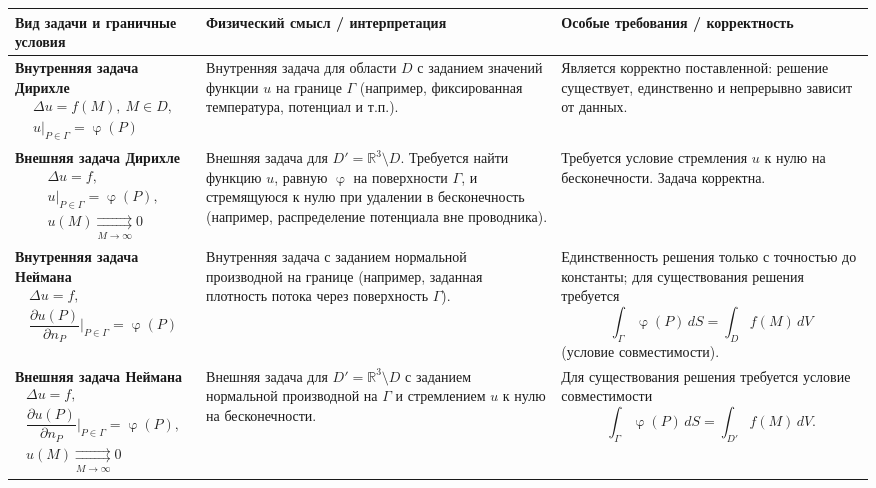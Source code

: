 \documentclass[a4paper, 12pt]{report}
\numberwithin{equation}{section}
\renewcommand{\varphi}{\upvarphi}
\begin{document}
	\begin{table}[h!]
		\renewcommand{\arraystretch}{1.4}
		\begin{tabular}{|p{5.5cm}|p{6cm}|p{5cm}|}
			\hline
			\textbf{Вид задачи и граничные условия} & \textbf{Физический смысл / интерпретация} & \textbf{Особые требования / корректность} \\
			\hline
			
			\textbf{Внутренняя задача Дирихле} 
			$$\begin{gathered}
				\Delta u = f(M),\ M \in D, \\
				u|_{P \in \Gamma} = \varphi(P)
			\end{gathered}$$
			& 
			Внутренняя задача для области $D$ с заданием значений функции $u$ на границе $\Gamma$ (например, фиксированная температура, потенциал и т.п.). 
			&
			Является корректно поставленной: решение существует, единственно и непрерывно зависит от данных. 
			\\
			\hline
			
			\textbf{Внешняя задача Дирихле} 
			$$\begin{gathered}
				\Delta u = f, \\
				u|_{P \in \Gamma} = \varphi(P), \\
				u(M) \underset{M\to\infty}{\rightrightarrows} 0
			\end{gathered}$$
			& 
			Внешняя задача для $D' = \mathbb{R}^3 \setminus D$. Требуется найти функцию $u$, равную $\varphi$ на поверхности $\Gamma$, и стремящуюся к нулю при удалении в бесконечность (например, распределение потенциала вне проводника).
			&
			Требуется условие стремления $u$ к нулю на бесконечности. Задача корректна.
			\\
			\hline
			
			\textbf{Внутренняя задача Неймана} 
			$$\begin{gathered}
				\Delta u = f, \\
				\dfrac{\partial u(P)}{\partial n_P}|_{P\in \Gamma} = \varphi(P)
			\end{gathered}$$
			& 
			Внутренняя задача с заданием нормальной производной на границе (например, заданная плотность потока через поверхность $\Gamma$).
			&
			Единственность решения только с точностью до константы; для существования решения требуется $$\int_\Gamma \varphi(P)\, dS = \int_D f(M)\, dV$$ (условие совместимости).
			\\
			\hline
			
			\textbf{Внешняя задача Неймана}
			$$\begin{gathered}
				\Delta u = f, \\
				\dfrac{\partial u(P)}{\partial n_P}|_{P\in \Gamma} = \varphi(P), \\
				u(M) \underset{M\to\infty}{\rightrightarrows} 0
			\end{gathered}$$
			&
			Внешняя задача для $D' = \mathbb{R}^3 \setminus D$ с заданием нормальной производной на $\Gamma$ и стремлением $u$ к нулю на бесконечности.
			&
			Для существования решения требуется условие совместимости $$\int_\Gamma \varphi(P)\, dS = \int_{D'} f(M)\, dV.$$
			\\
			\hline
		\end{tabular}
	\end{table}
	
\end{document}
